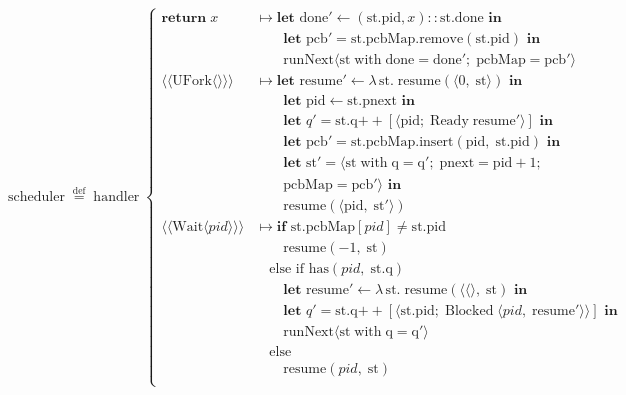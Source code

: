 \documentclass[logo,bsc,singlespacing,parskip]{infthesis}
\begin{document}
\[
\mathrm{scheduler} \;\overset{\mathrm{def}}{=}\;
\mathrm{handler} \;\left\{
\begin{array}{ll}
  \mathbf{return}\; x 
    & \mapsto \textbf{let } \mathrm{done'} \leftarrow (\mathrm{st.pid}, x) :: \mathrm{st.done} \textbf{ in} \\
    & \quad\quad \textbf{let } \mathrm{pcb'} = \mathrm{st.pcbMap.remove}(\mathrm{st.pid}) \textbf{ in} \\
    & \quad\quad \mathrm{runNext} \langle \mathrm{st\; with\; done = done';\; pcbMap = pcb'} \rangle
    
    \\[1ex]

  \langle\!\langle \mathrm{UFork} \langle\rangle \rangle\!\rangle 
    & \mapsto \textbf{let } \mathrm{resume'} \leftarrow \lambda\, \mathrm{st}.\; \mathrm{resume}(\langle 0,\; \mathrm{st} \rangle) \textbf{ in} \\
    & \quad\quad \textbf{let } \mathrm{pid} \leftarrow \mathrm{st.pnext} \textbf{ in} \\
    & \quad\quad \textbf{let } q' = \mathrm{st.q} \mathbin{++} [\langle \mathrm{pid};\; \mathrm{Ready}\; \mathrm{resume'} \rangle] \textbf{ in} \\
    & \quad\quad \textbf{let } \mathrm{pcb'} = \mathrm{st.pcbMap.insert}(\mathrm{pid},\; \mathrm{st.pid}) \textbf{ in} \\
    & \quad\quad \textbf{let } \mathrm{st'} = \langle \mathrm{st\; with\; q = q';\; pnext = pid} + 1;\; \\ 
    & \quad\quad\mathrm{pcbMap = pcb'} \rangle \textbf{ in} \\
    & \quad\quad \mathrm{resume}(\langle \mathrm{pid},\; \mathrm{st'} \rangle) \\[1ex]

  \langle\!\langle \mathrm{Wait} \langle pid \rangle \rangle\!\rangle 
    & \mapsto \textbf{if } \mathrm{st.pcbMap}[pid] \neq \mathrm{st.pid} \\
    & \quad\quad  \mathrm{resume}(-1,\; \mathrm{st}) \\[0.5ex]
    & \quad \text{else if } \mathrm{has}(pid,\; \mathrm{st.q}) \\
    & \quad\quad \textbf{let } \mathrm{resume'} \leftarrow \lambda\, \mathrm{st}.\; \mathrm{resume}(\langle\langle\rangle,\; \mathrm{st}) \textbf{ in} \\
    & \quad\quad \textbf{let } q' = \mathrm{st.q} \mathbin{++} [\langle \mathrm{st.pid};\; \mathrm{Blocked}\; \langle pid,\; \mathrm{resume'} \rangle \rangle] \textbf{ in} \\
    & \quad\quad \mathrm{runNext} \langle \mathrm{st\; with\; q = q'} \rangle \\[0.5ex]
    & \quad \text{else } \\ 
    & \quad\quad\mathrm{resume}(pid,\; \mathrm{st}) 
    \\
    


\end{array}\]
\end{document}
